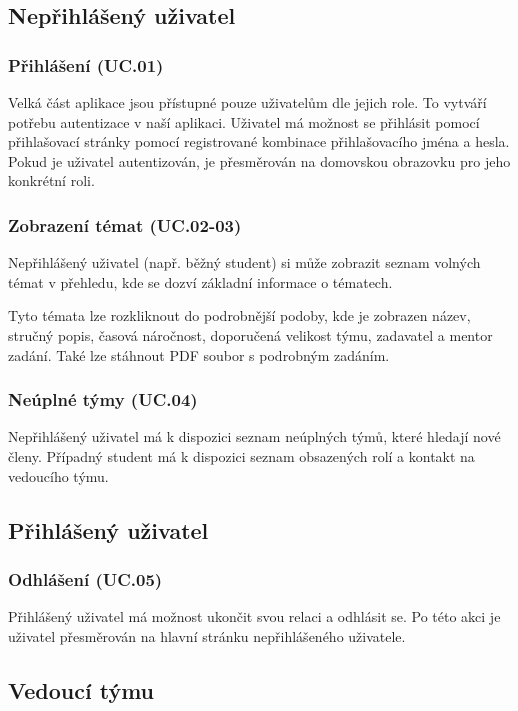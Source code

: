 \documentclass[czech,BP]{thesiskiv}
\begin{document}
		\subsection{Nepřihlášený uživatel}
			\subsubsection{Přihlášení (UC.01)}
				\par Velká část aplikace jsou přístupné pouze uživatelům dle jejich role. To vytváří potřebu autentizace v naší aplikaci. Uživatel má možnost se přihlásit pomocí přihlašovací stránky pomocí registrované kombinace přihlašovacího jména a hesla. Pokud je uživatel autentizován, je přesměrován na domovskou obrazovku pro jeho konkrétní roli.
			\subsubsection{Zobrazení témat (UC.02-03)}
				\par Nepřihlášený uživatel (např. běžný student) si může zobrazit seznam volných témat v přehledu, kde se dozví základní informace o tématech.
				\par Tyto témata lze rozkliknout do podrobnější podoby, kde je zobrazen název, stručný popis, časová náročnost, doporučená velikost týmu, zadavatel a mentor zadání. Také lze stáhnout PDF soubor s podrobným zadáním.
			\subsubsection{Neúplné týmy (UC.04)}
				\par Nepřihlášený uživatel má k dispozici seznam neúplných týmů, které hledají nové členy. Případný student má k dispozici seznam obsazených rolí a kontakt na vedoucího týmu.
		\subsection{Přihlášený uživatel}
			\subsubsection{Odhlášení (UC.05)}
				\par Přihlášený uživatel má možnost ukončit svou relaci a odhlásit se. Po této akci je uživatel přesměrován na hlavní stránku nepřihlášeného uživatele.
		\subsection{Vedoucí týmu}
\end{document}

